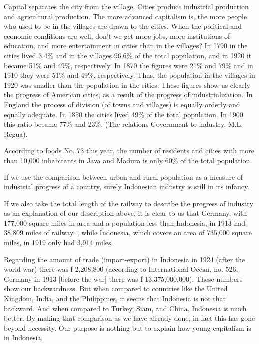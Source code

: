 Capital separates the city from the village. Cities produce industrial production 
and agricultural production. The more advanced capitalism is, the more people who 
used to be in the villages are drawn to the cities. When the political and 
economic conditions are well, don't we get more jobs, more institutions of 
education, and more entertainment in cities than in the villages? In 1790 in the 
cities lived 3.4\% and in the villages 96.6\% of the total population, and in 1920 it 
became 51\% and 49\%, respectively. In 1870 the figures were 21\% and 79\% and in 1910 
they were 51\% and 49\%, respectively. Thus, the population in the villages in 1920 was 
smaller than the population in the cities. These figures show us clearly the progress of 
American cities, as a result of the progress of industrialization. In England 
the process of division (of towns and villages) is equally orderly and equally 
adequate. In 1850 the cities lived 49\% of the total population. 
In 1900 this ratio became 77\% and 23\%, (The relations Government to industry, M.L. Regua).\nline

According to foods No. 73 this year, the number of residents and 
cities with more than 10,000 inhabitants in Java and Madura is only 60\% of the total population.\nline

If we use the comparison between urban and rural population as a measure of 
industrial progress of a country, surely Indonesian industry is still in its infancy.\nline

If we also take the total length of the railway to describe the progress of 
industry as an explanation of our description above, it is clear to us that Germany, 
with 177,000 square miles in area and a population less than Indonesia, in 1913 had 
38,809 miles of railway. , while Indonesia, which covers an area of 735,000 square miles, in 1919 only had 3,914 miles.\nline

Regarding the amount of trade (import-export) in Indonesia in 1924 
(after the world war) there was f 2,208,800 (according to International Ocean, 
no. 526, Germany in 1913 [before the war] there was f 13,375,000,000). 
These numbers show our backwardness. But when compared to countries like the 
United Kingdom, India, and the Philippines, it seems that Indonesia is not 
that backward. And when compared to Turkey, Siam, and China, Indonesia 
is much better. By making that comparison as we have already done, in fact 
this has gone beyond necessity. Our purpose is nothing but to explain how young capitalism is in Indonesia.\nline

